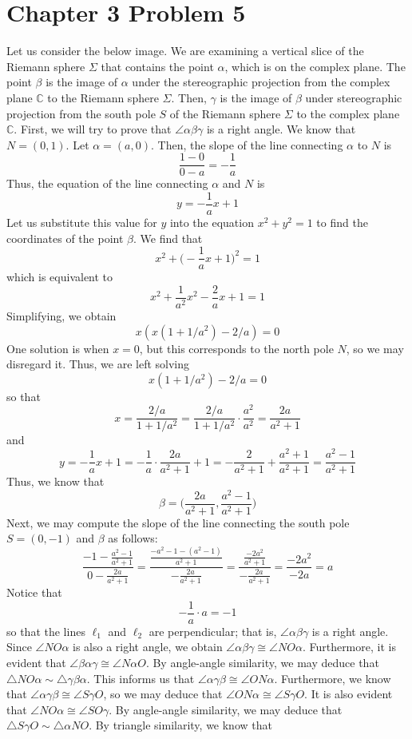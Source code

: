 \documentclass[12pt]{article}
\begin{document}
\section*{Chapter 3 Problem 5}
Let us consider the below image. We are examining a vertical slice of the Riemann sphere $\Sigma$ that contains the point $\alpha$, which is on the complex plane. The point $\beta$ is the image of $\alpha$ under the stereographic projection from the complex plane $\mathbb{C}$ to the Riemann sphere $\Sigma$. Then, $\gamma$ is the image of $\beta$ under stereographic projection from the south pole $S$ of the Riemann sphere $\Sigma$ to the complex plane $\mathbb{C}$. First, we will try to prove that $\angle \alpha \beta \gamma$ is a right angle. We know that $N = (0,1)$. Let $\alpha = (a,0)$. Then, the slope of the line connecting $\alpha$ to $N$ is 
\[
\frac{1-0}{0-a} = - \frac{1}{a}
\] Thus, the equation of the line connecting $\alpha$ and $N$ is
\[
y = -\frac{1}{a}x + 1
\] Let us substitute this value for $y$ into the equation $x^2+y^2 = 1$ to find the coordinates of the point $\beta$. We find that
\[
x^2 + \bigg(-\frac{1}{a}x + 1\bigg)^2 = 1
\] which is equivalent to
\[
x^2 + \frac{1}{a^2}x^2 - \frac{2}{a}x + 1 = 1
\] Simplifying, we obtain
\[
x(x(1+ 1/a^2)-2/a) = 0
\] One solution is when $x=0$, but this corresponds to the north pole $N$, so we may disregard it. Thus, we are left solving
\[
x(1+ 1/a^2)-2/a = 0
\] so that
\[
x = \frac{2/a}{1+1/a^2} = \frac{2/a}{1+1/a^2} \cdot \frac{a^2}{a^2} = \frac{2a}{a^2+1}
\] and 
\[
y = -\frac{1}{a}x + 1 = -\frac{1}{a} \cdot \frac{2a}{a^2+1} + 1 = -\frac{2}{a^2+1} + \frac{a^2+1}{a^2+1} = \frac{a^2-1}{a^2+1}
\] Thus, we know that
\[
\beta = \bigg(\frac{2a}{a^2+1}, \frac{a^2 - 1}{a^2 + 1}\bigg)
\] Next, we may compute the slope of the line connecting the south pole $S = (0,-1)$ and $\beta$ as follows:
\[
\frac{-1 - \frac{a^2 - 1}{a^2 + 1}}{0-\frac{2a}{a^2+1}} = \frac{\frac{-a^2 - 1 - (a^2 - 1)}{a^2+1}}{-\frac{2a}{a^2+1}} = \frac{\frac{-2a^2}{a^2+1}}{-\frac{2a}{a^2+1}} = \frac{-2a^2}{-2a} = a
\] Notice that 
\[
-\frac{1}{a} \cdot a = -1
\] so that the lines $\ell_1$ and $\ell_2$ are perpendicular; that is, $\angle \alpha \beta \gamma$ is a right angle. Since $\angle NO\alpha$ is also a right angle, we obtain $\angle \alpha \beta \gamma \cong \angle NO \alpha$. Furthermore, it is evident that $\angle \beta \alpha \gamma \cong \angle N \alpha O$. By angle-angle similarity, we may deduce that $\triangle NO \alpha \sim \triangle \gamma \beta \alpha$. This informs us that $\angle \alpha \gamma \beta \cong \angle ON\alpha$. Furthermore, we know that $\angle \alpha \gamma \beta \cong \angle S \gamma O$, so we may deduce that $\angle ON\alpha \cong \angle S \gamma O$. It is also evident that $\angle NO\alpha \cong \angle SO\gamma$. By angle-angle similarity, we may deduce that $\triangle S\gamma O \sim \triangle \alpha N O$. By triangle similarity, we know that 
\end{document}
